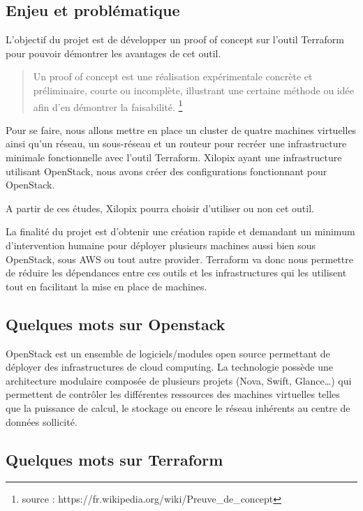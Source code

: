 \documentclass[]{article}
\begin{document}
\subsection{Enjeu et problématique}\label{enjeu-et-probluxe9matique}

L'objectif du projet est de développer un proof of concept sur l'outil
Terraform pour pouvoir démontrer les avantages de cet outil.

\begin{quote}
Un proof of concept est une réalisation expérimentale concrète et
préliminaire, courte ou incomplète, illustrant une certaine méthode ou
idée afin d'en démontrer la faisabilité. \footnote{source : https://fr.wikipedia.org/wiki/Preuve\_de\_concept}
\end{quote}

Pour se faire, nous allons mettre en place un cluster de quatre machines
virtuelles ainsi qu'un réseau, un sous-réseau et un routeur pour recréer
une infrastructure minimale fonctionnelle avec l'outil Terraform.
Xilopix ayant une infrastructure utilisant OpenStack, nous avons créer
des configurations fonctionnant pour OpenStack.

A partir de ces études, Xilopix pourra choisir d'utiliser ou non cet
outil.

La finalité du projet est d'obtenir une création rapide et demandant un
minimum d'intervention humaine pour déployer plusieurs machines aussi
bien sous OpenStack, sous AWS ou tout autre provider. Terraform va donc
nous permettre de réduire les dépendances entre ces outils et les
infrastructures qui les utilisent tout en facilitant la mise en place de
machines.

\subsection{Quelques mots sur
Openstack}\label{quelques-mots-sur-openstack}

OpenStack est un ensemble de logiciels/modules open source permettant de
déployer des infrastructures de cloud computing. La technologie possède
une architecture modulaire composée de plusieurs projets (Nova, Swift,
Glance\ldots{}) qui permettent de contrôler les différentes ressources
des machines virtuelles telles que la puissance de calcul, le stockage
ou encore le réseau inhérents au centre de données sollicité.

\subsection{Quelques mots sur
Terraform}\label{quelques-mots-sur-terraform}
\end{document}
